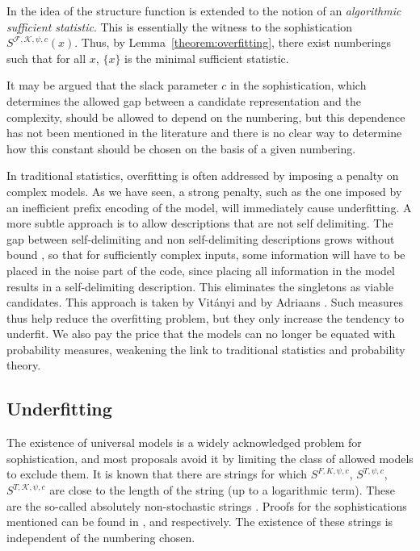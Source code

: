 \documentclass{style/llncs}
\newcommand{\F}{\mathscr F}
\newcommand{\K}{\mathscr K}
\newcommand{\s}{S}
\begin{document}
In \cite{gacs2001algorithmic} the idea of the structure function is extended to the notion of an \emph{algorithmic sufficient statistic}. This is essentially the witness to the sophistication $\s^{\F,\K,\psi,c}(x)$. Thus, by Lemma~\ref{theorem:overfitting}, there exist numberings such that for all $x$, $\{x\}$ is the minimal sufficient statistic. 

It may be argued that the slack parameter $c$ in the sophistication, which determines the allowed gap between a candidate representation and the complexity, should be allowed to depend on the numbering, but this dependence has not been mentioned in the literature and there is no clear way to determine how this constant should be chosen on the basis of a given numbering. 

In traditional statistics, overfitting is often addressed by imposing a penalty on complex models. As we have seen, a strong penalty, such as the one imposed by an inefficient prefix encoding of the model, will immediately cause underfitting. A more subtle approach is to allow descriptions that are not self delimiting. The gap between self-delimiting and non self-delimiting descriptions grows without bound 
\cite[Section~4.5.5]{li1993introduction}, so that for sufficiently complex inputs, some information will have to be placed in the noise part of the code, since placing all information in the model results in a self-delimiting description. This eliminates the singletons as viable candidates. This approach is taken by Vit\'anyi \cite{vitanyi2004meaningful} and by Adriaans \cite{adriaans2012facticity}. Such measures thus help reduce the overfitting problem, but they only increase the tendency to underfit. We also pay the price that the models can no longer be equated with probability measures, weakening the link to traditional statistics and probability theory.

\subsection{Underfitting}
\label{section:underfitting}

The existence of universal models is a widely acknowledged problem for sophistication, and most proposals avoid it by limiting the class of allowed models to exclude them. It is known that there are strings for which $\s^{F, K, \psi, c}$, $\s^{T, \psi, c}$, $\s^{T, \K, \psi, c}$ are close to the length of the string (up to a logarithmic term). These are the so-called absolutely non-stochastic strings \cite{shen1983concept}. Proofs for the sophistications mentioned can be found in \cite{gacs2001algorithmic}, \cite{antunes2009sophistication} and \cite{vitanyi2004meaningful} respectively. The existence of these strings is independent of the numbering chosen. 
\end{document}
